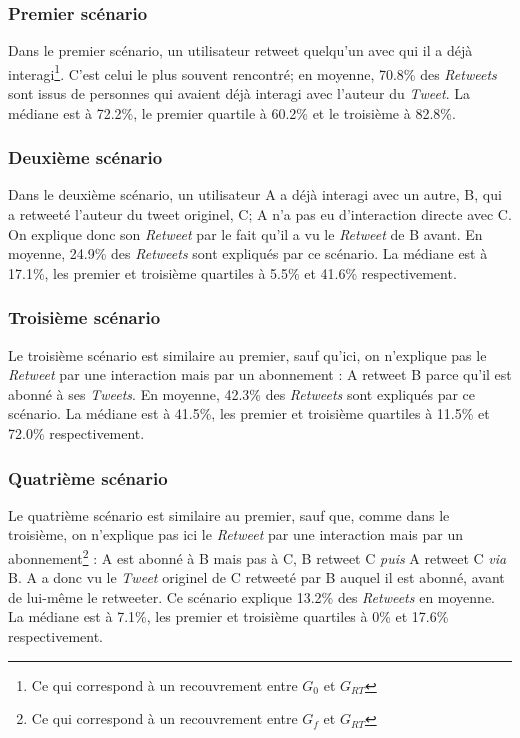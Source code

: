 \documentclass[]{article}
\begin{document}
\subsubsection{Premier scénario}

Dans le premier scénario, un utilisateur retweet quelqu'un avec qui il a
déjà interagi\footnote{Ce qui correspond à un recouvrement entre $G_0$
et $G_{RT}$}. C'est celui le plus souvent rencontré; en moyenne,
70.8\% des \emph{Retweets} sont issus de personnes qui avaient déjà 
interagi avec l'auteur du \emph{Tweet}. La médiane est à 72.2\%, le
premier quartile à 60.2\% et le troisième à 82.8\%.

\subsubsection{Deuxième scénario}

Dans le deuxième scénario, un utilisateur A a déjà interagi avec un
autre, B, qui a retweeté l'auteur du tweet originel, C; A n'a pas eu
d'interaction directe avec C. On explique donc son \emph{Retweet} par le
fait qu'il a vu le \emph{Retweet} de B avant. En moyenne, 24.9\% des
\emph{Retweets} sont expliqués par ce scénario. La médiane est à 17.1\%,
les premier et troisième quartiles à 5.5\% et 41.6\% respectivement.

\subsubsection{Troisième scénario}

Le troisième scénario est similaire au premier, sauf qu'ici, on
n'explique pas le \emph{Retweet} par une interaction mais par un
abonnement : A retweet B parce qu'il est abonné à ses \emph{Tweets}. En
moyenne, 42.3\% des \emph{Retweets} sont expliqués par ce scénario. La
médiane est à 41.5\%, les premier et troisième quartiles à 11.5\% et
72.0\% respectivement.

\subsubsection{Quatrième scénario}

Le quatrième scénario est similaire au premier, sauf que, comme dans le
troisième, on n'explique pas ici le \emph{Retweet} par une interaction
mais par un abonnement\footnote{Ce qui correspond à un recouvrement entre $G_f$
et $G_{RT}$} : A est abonné à B mais pas à C, B retweet C
\emph{puis} A retweet C \emph{via} B. A a donc vu le \emph{Tweet}
originel de C retweeté par B auquel il est abonné, avant de lui-même le
retweeter. Ce scénario explique 13.2\% des \emph{Retweets} en moyenne.
La médiane est à 7.1\%, les premier et troisième quartiles à 0\% et
17.6\% respectivement.
\end{document}
